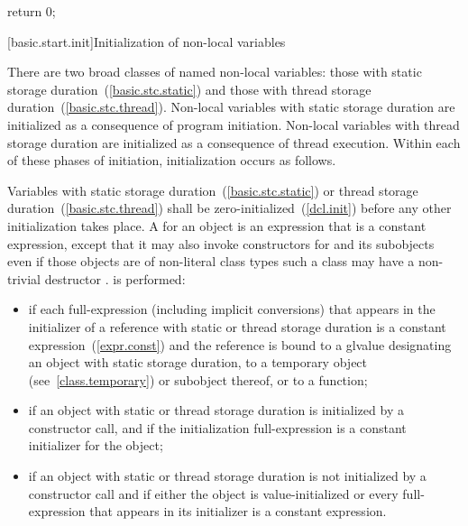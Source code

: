 \begin{codeblock}
return 0;
\end{codeblock}

[basic.start.init]{Initialization of non-local variables}

\pnum
{}%
%
There are two broad classes of named non-local variables: those with static storage
duration~(\ref{basic.stc.static}) and those with thread storage
duration~(\ref{basic.stc.thread}). Non-local variables with static storage duration
are initialized as a consequence of program initiation. Non-local variables with
thread storage duration are initialized as a consequence of thread execution.
Within each of these phases of initiation, initialization occurs as follows.

\pnum
{}%
%
%
%
%
Variables with static storage duration~(\ref{basic.stc.static}) or thread storage
duration~(\ref{basic.stc.thread}) shall be zero-initialized~(\ref{dcl.init}) before
any other initialization takes place.
A  for an object  is an expression that is a
constant expression, except that it may also invoke  constructors
for  and its subobjects even if those objects are of non-literal class
types \enternote such a class may have a non-trivial destructor \exitnote.
%
 is performed:

\begin{itemize}
\item
if each full-expression (including implicit conversions) that appears in
the initializer of a reference with static or thread storage duration is a
constant expression~(\ref{expr.const}) and the reference is bound to a glvalue
designating an object with static storage duration, to a temporary object
(see~\ref{class.temporary}) or subobject thereof, or to a function;

\item
if an object with static or thread storage duration is initialized
by a constructor call, and if the initialization full-expression is a constant
initializer for the object;

\item
if an object with static or thread storage duration is not initialized by a constructor call
and if either the object is value-initialized or every full-expression that
appears in its initializer is a constant expression.

\end{itemize}

